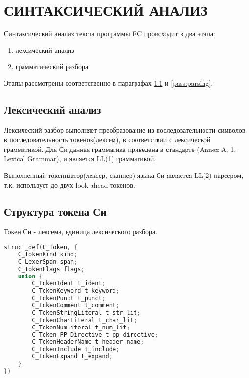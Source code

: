 
\chapter{СИНТАКСИЧЕСКИЙ АНАЛИЗ}

Синтаксический анализ текста программы EC происходит в два этапа: 
\begin{enumerate}
    \item лексический анализ
    \item грамматический разбора
\end{enumerate}

Этапы рассмотрены соответственно в параграфах \ref{pass:lexing} и \ref{pass:parsing}.

\section{Лексический анализ}
\label{pass:lexing}

Лексический разбор выполняет преобразование из последовательности символов в последовательность токенов(лексем), в соответствии с лексической грамматикой.
Для Си данная грамматика приведена в стандарте\cite{c99_std} (Annex A, 1. Lexical Grammar), и является LL(1) грамматикой.

Выполненный токенизатор(лексер, сканнер) языка Си является LL(2) парсером, т.к. использует до двух look-ahead токенов.

\section{Структура токена Си}

Токен Си - лексема, единица лексического разбора.

\begin{lstlisting}[language=c, caption={Структура токена Си}, label={lexing:c-token-struct}]
struct_def(C_Token, {
    C_TokenKind kind;
    C_LexerSpan span;
    C_TokenFlags flags;
    union {
        C_TokenIdent t_ident;
        C_TokenKeyword t_keyword;
        C_TokenPunct t_punct;
        C_TokenComment t_comment;
        C_TokenStringLiteral t_str_lit;
        C_TokenCharLiteral t_char_lit;
        C_TokenNumLiteral t_num_lit;
        C_Token_PP_Directive t_pp_directive;
        C_TokenHeaderName t_header_name;
        C_TokenInclude t_include;
        C_TokenExpand t_expand;
    };
})
\end{lstlisting}

